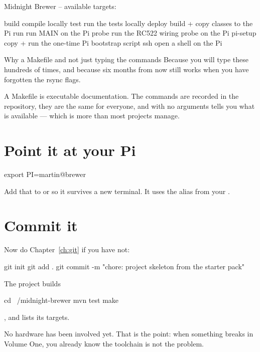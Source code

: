 \begin{trace}
Midnight Brewer -- available targets:

  build        compile locally
  test         run the tests locally
  deploy       build + copy classes to the Pi
  run          run MAIN on the Pi
  probe        run the RC522 wiring probe on the Pi
  pi-setup     copy + run the one-time Pi bootstrap script
  ssh          open a shell on the Pi
\end{trace}

\begin{concept}{Why a Makefile and not just typing the commands}
Because you will type these hundreds of times, and because six months from now
 still works when you have forgotten the rsync flags.

A Makefile is executable documentation. The commands are recorded in the
repository, they are the same for everyone, and  with no arguments
tells you what is available --- which is more than most projects manage.
\end{concept}

\section{Point it at your Pi}

\begin{shell}
export PI=martin@brewer
\end{shell}

Add that to  or  so it
survives a new terminal. It uses the  alias from your
.

\section{Commit it}

Now do Chapter~\ref{ch:git} if you have not:

\begin{shell}
git init
git add .
git commit -m "chore: project skeleton from the starter pack"
\end{shell}

\begin{checkpoint}{The project builds}
\begin{shell}
cd ~/midnight-brewer
mvn test
make
\end{shell}

, and  lists its targets.

No hardware has been involved yet. That is the point: when something breaks in
Volume One, you already know the toolchain is not the problem.
\end{checkpoint}
